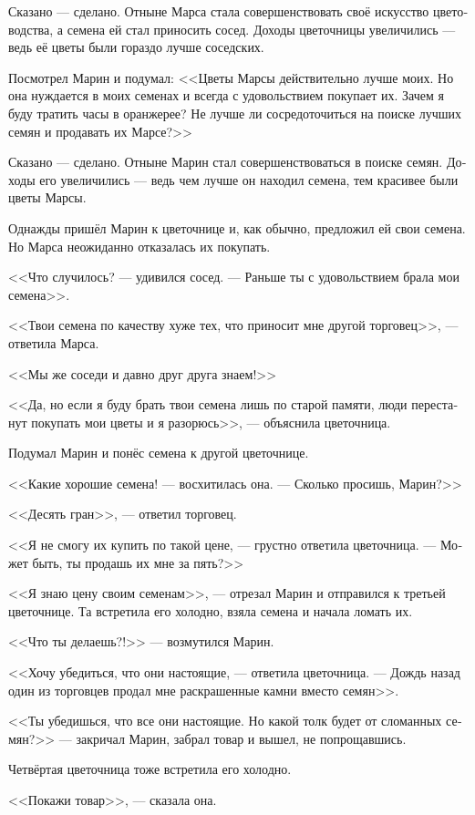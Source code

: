 \documentclass[a4paper,12pt,fleqn]{book}\usepackage{cooltooltips}\usepackage{polyglossia}\setdefaultlanguage[babelshorthands=true]{russian}\setotherlanguage{english}\defaultfontfeatures{Ligatures=TeX,Mapping=tex-text} \usepackage{xcolor}\definecolor{lightgray}{HTML}{bbbbbb}\color{lightgray}\newcommand{\ml}[3]{\textenglish{\textcolor{black}{#3}}}
\begin{document}
{Сказано --- сделано.
Отныне Марса стала совершенствовать своё искусство цветоводства, а семена ей стал приносить сосед.
Доходы цветочницы увеличились --- ведь её цветы были гораздо лучше соседских.

Посмотрел Марин и подумал: <<Цветы Марсы действительно лучше моих.
Но она нуждается в моих семенах и всегда с удовольствием покупает их.
Зачем я буду тратить часы в оранжерее?
Не лучше ли сосредоточиться на поиске лучших семян и продавать их Марсе?>>

Сказано --- сделано.
Отныне Марин стал совершенствоваться в поиске семян.
Доходы его увеличились --- ведь чем лучше он находил семена, тем красивее были цветы Марсы.

Однажды пришёл Марин к цветочнице и, как обычно, предложил ей свои семена.
Но Марса неожиданно отказалась их покупать.

<<Что случилось? --- удивился сосед.
--- Раньше ты с удовольствием брала мои семена>>.

<<Твои семена по качеству хуже тех, что приносит мне другой торговец>>, --- ответила Марса.

<<Мы же соседи и давно друг друга знаем!>>

<<Да, но если я буду брать твои семена лишь по старой памяти, люди перестанут покупать мои цветы и я разорюсь>>, --- объяснила цветочница.

Подумал Марин и понёс семена к другой цветочнице.

<<Какие хорошие семена! --- восхитилась она.
--- Сколько просишь, Марин?>>

<<Десять гран>>, --- ответил торговец.

<<Я не смогу их купить по такой цене, --- грустно ответила цветочница.
--- Может быть, ты продашь их мне за пять?>>

<<Я знаю цену своим семенам>>, --- отрезал Марин и отправился к третьей цветочнице.
Та встретила его холодно, взяла семена и начала ломать их.

<<Что ты делаешь?!>> --- возмутился Марин.

<<Хочу убедиться, что они настоящие, --- ответила цветочница.
--- Дождь назад один из торговцев продал мне раскрашенные камни вместо семян>>.

<<Ты убедишься, что все они настоящие.
Но какой толк будет от сломанных семян?>> --- закричал Марин, забрал товар и вышел, не попрощавшись.

Четвёртая цветочница тоже встретила его холодно.

<<Покажи товар>>, --- сказала она.

}
\end{document}
